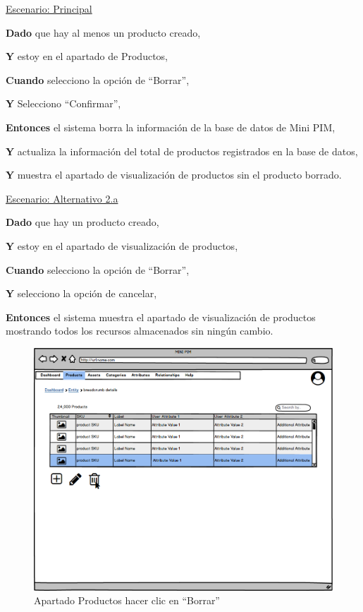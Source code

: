 \underline{Escenario: Principal}\par
\vspace{0.15cm}
\textbf{Dado} que hay al menos un producto creado,\par
\textbf{Y} estoy en el apartado de Productos,\par
\textbf{Cuando} selecciono la opción de \enquote{Borrar},\par
\textbf{Y} Selecciono \enquote{Confirmar},\par
\textbf{Entonces} el sistema borra la información de la base de datos de Mini PIM,\par
\textbf{Y} actualiza la información del total de productos registrados en la base de datos,\par
\textbf{Y} muestra el apartado de visualización de productos sin el producto borrado.\par
\vspace{0.20cm}

\underline{Escenario: Alternativo 2.a}\par
\vspace{0.15cm}
\textbf{Dado} que hay un producto creado,\par
\textbf{Y} estoy en el apartado de visualización de productos,\par
\textbf{Cuando} selecciono la opción de \enquote{Borrar},\par
\textbf{Y} selecciono la opción de cancelar,\par
\textbf{Entonces} el sistema muestra el apartado de visualización de productos mostrando todos los recursos almacenados sin ningún cambio.\par
\vspace{0.20cm}

\begin{figure}[H]
    \includegraphics[width=1\linewidth]{mockups/RF2-X Borrar Producto (Borrar Producto desde listado).png}
    \caption{Apartado Productos hacer clic en \enquote{Borrar}}
   \end{figure}
\vspace{1.0cm}

